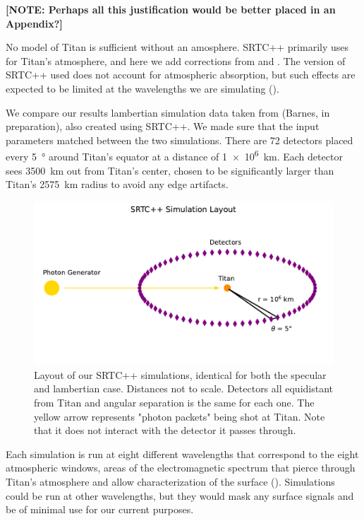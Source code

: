 \documentclass{article}
\begin{document}
\textbf{\color{red} [NOTE: Perhaps all this justification would be better placed in an Appendix?] \color{black}}

No model of Titan is sufficient without an amosphere. SRTC++ primarily uses \cite{Tomasko2008} for Titan's atmosphere, and here we add corrections from \cite{Hirtzig2013} and \cite{Rodriguez2018}. The version of SRTC++ used does not account for atmospheric absorption, but such effects are expected to be limited at the wavelengths we are simulating (\cite{EsSayeh2023}).

We compare our results lambertian simulation data taken from (Barnes, in preparation), also created using SRTC++. We made sure that the input parameters matched between the two simulations. There are 72 detectors placed every \qty{5}{\degree} around Titan's equator at a distance of \qty{1e6}{\kilo\meter}. Each detector sees \qty{3500}{\kilo\meter} out from Titan's center, chosen to be significantly larger than Titan's \qty{2575}{\kilo\meter} radius to avoid any edge artifacts. 

\begin{figure}[htb]
\includegraphics[scale = 0.5]{SRTCLayout.pdf}
\centering
\caption{Layout of our SRTC++ simulations, identical for both the specular and lambertian case. Distances not to scale. Detectors all equidistant from Titan and angular separation is the same for each one. The yellow arrow represents "photon packets" being shot at Titan. Note that it does not interact with the detector it passes through.}
\label{fig:5}
\end{figure}

Each simulation is run at eight different wavelengths that correspond to the eight atmospheric windows, areas of the electromagnetic spectrum that pierce through Titan's atmosphere and allow characterization of the surface (\cite{Barnes2007}). Simulations could be run at other wavelengths, but they would mask any surface signals and be of minimal use for our current purposes. 
\end{document}

